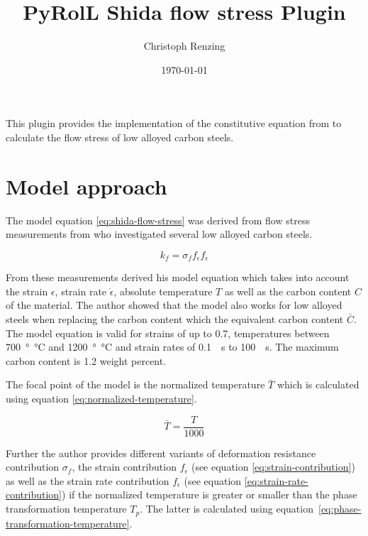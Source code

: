 \documentclass[11pt]{PyRollDocs}
\begin{document}
    \title{PyRolL Shida flow stress Plugin}
    \author{Christoph Renzing}
    \date{\today}

    \maketitle

    This plugin provides the implementation of the constitutive equation from \textcite{Shida1968, Shida1969} to calculate the flow stress of low alloyed carbon steels.


    \section{Model approach}\label{sec:model-approach}

    The model equation \ref{eq:shida-flow-stress} was derived from flow stress measurements from \textcite{Suzuki1968} who investigated several low alloyed carbon steels.

    \begin{equation}
        k_f = \sigma_f f_{\epsilon} f_{\dot{\epsilon}}
        \label{eq:shida-flow-stress}
    \end{equation}

    From these measurements \textcite{Shida1968, Shida1969} derived his model equation which takes into account the strain $\epsilon$, strain rate $\dot{\epsilon}$, absolute temperature $T$ as well as the carbon content $C$ of the material.
    The author showed that the model also works for low alloyed steels when replacing the carbon content which the equivalent carbon content $\bar{C}$.
    The model equation is valid for strains of up to 0.7, temperatures between \qty{700}{\degree\celsius} and \qty{1200}{\degree\celsius} and strain rates of \qty{0.1}{\per\second} to \qty{100}{\per\second}.
    The maximum carbon content is 1.2 weight percent.

    The focal point of the model is the normalized temperature $\bar{T}$ which is calculated using equation \ref{eq:normalized-temperature}.

    \begin{equation}
        \bar{T} = \frac{T}{1000}
        \label{eq:normalized-temperature}
    \end{equation}

    Further the author provides different variants of deformation resistance contribution $\sigma_f$, the strain contribution $f_{\epsilon}$ (see equation \ref{eq:strain-contribution}) as well as the strain rate contribution $f_{\dot{\epsilon}}$ (see equation \ref{eq:strain-rate-contribution}) if the normalized temperature is greater or smaller than the phase transformation temperature $T_p$.
    The latter is calculated using equation~\ref{eq:phase-transformation-temperature}.
\end{document}
